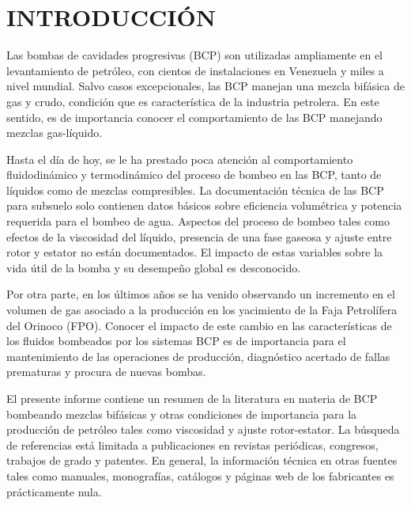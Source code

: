 \chapter{INTRODUCCIÓN}


Las bombas de cavidades progresivas (BCP) son utilizadas ampliamente en el levantamiento de petróleo, con cientos de instalaciones en Venezuela y miles a nivel mundial. Salvo casos excepcionales, las BCP manejan una mezcla bifásica de gas y crudo, condición que es característica de la industria petrolera. En este sentido, es de importancia conocer el comportamiento de las BCP manejando mezclas gas-líquido.

Hasta el día de hoy, se le ha prestado poca atención al comportamiento fluidodinámico y termodinámico del proceso de bombeo en las BCP, tanto de líquidos como de mezclas compresibles. La documentación técnica de las BCP para subsuelo solo contienen datos básicos sobre eficiencia volumétrica y potencia requerida para el bombeo de agua. Aspectos del proceso de bombeo tales como efectos de la viscosidad del líquido,  presencia de una fase gaseosa y ajuste entre rotor y estator no están documentados. El impacto de estas variables sobre la vida útil de la bomba y su desempeño global es desconocido.

Por otra parte, en los últimos años se ha venido observando un incremento en el volumen de gas asociado a la producción en los yacimiento de la Faja Petrolífera del Orinoco (FPO). Conocer el impacto de este cambio en las características de los fluidos bombeados por los sistemas BCP es de importancia para el mantenimiento de las operaciones de producción, diagnóstico acertado de fallas prematuras y procura de nuevas bombas.

El presente informe contiene un resumen de la literatura en materia de BCP bombeando mezclas bifásicas y otras condiciones de importancia para la producción de petróleo tales como viscosidad y ajuste rotor-estator. La búsqueda de referencias está limitada a publicaciones en revistas periódicas, congresos, trabajos de grado y patentes. En general, la información técnica en otras fuentes tales como manuales, monografías, catálogos y páginas web de los fabricantes es prácticamente nula.





